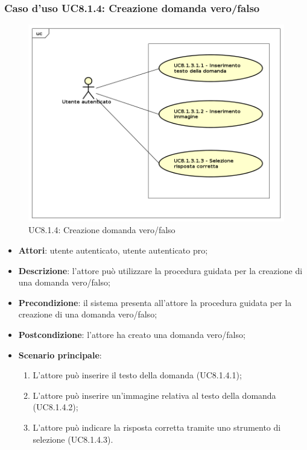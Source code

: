\subsubsection{Caso d'uso UC8.1.4: Creazione domanda vero/falso}
	\label{UC8.1.4}
	\begin{figure}[h]
		\centering
			\includegraphics[scale=0.45,keepaspectratio]{UML/UC8_1_4.png}
		\caption{UC8.1.4: Creazione domanda vero/falso}
	\end{figure}
	\FloatBarrier
	\begin{itemize}
		\item
			\textbf{Attori}: utente autenticato, utente autenticato pro;
		\item		
			\textbf{Descrizione}: l'attore può utilizzare la procedura guidata per la creazione di una domanda vero/falso;
		\item
			\textbf{Precondizione}: il sistema presenta all'attore la procedura guidata per la creazione di una domanda vero/falso; 
		\item
			\textbf{Postcondizione}: l'attore ha creato una domanda vero/falso;
		\item
			\textbf{Scenario principale}:
	       		\begin{enumerate}
	       			\item
	       			L'attore può inserire il testo della domanda (UC8.1.4.1);
	       			\item
	       			L'attore può inserire un'immagine relativa al testo della domanda (UC8.1.4.2);
					\item
					L'attore può indicare la risposta corretta tramite uno strumento di selezione (UC8.1.4.3).
	 			\end{enumerate}
	\end{itemize}

